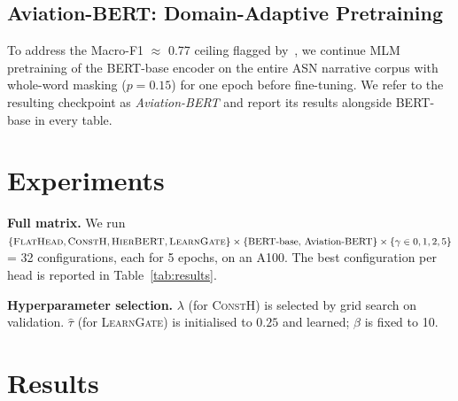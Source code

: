 \documentclass{article}
\newcommand{\modA}{\textsc{FlatHead}}
\newcommand{\modB}{\textsc{ConstH}}
\newcommand{\modC}{\textsc{HierBERT}}
\newcommand{\modD}{\textsc{LearnGate}}
\begin{document}
\subsection{Aviation-BERT: Domain-Adaptive Pretraining}
\label{sec:aviation_bert}

To address the Macro-F1 $\approx$ 0.77 ceiling flagged
by~\cite{jing2023bert}, we continue MLM pretraining of the BERT-base
encoder on the entire ASN narrative corpus with whole-word masking
($p = 0.15$) for one epoch before fine-tuning.
We refer to the resulting checkpoint as \textit{Aviation-BERT} and
report its results alongside BERT-base in every table.

\section{Experiments}

\textbf{Full matrix.}
We run $\{\modA,\modB,\modC,\modD\}\times
\{\text{BERT-base, Aviation-BERT}\}\times\{\gamma\in 0,1,2,5\}$ = 32
configurations, each for 5 epochs, on an A100.
The best configuration per head is reported in
Table~\ref{tab:results}.

\textbf{Hyperparameter selection.}
$\lambda$ (for \modB) is selected by grid search on validation.
$\hat{\tau}$ (for \modD) is initialised to $0.25$ and learned;
$\beta$ is fixed to 10.

\section{Results}
\end{document}
